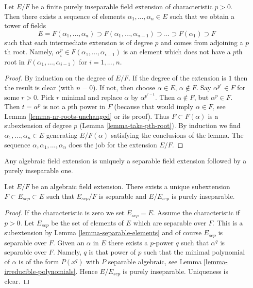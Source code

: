 \begin{lemma}
\label{lemma-finite-purely-inseparable}
Let $E/F$ be a finite purely inseparable field extension of
characteristic $p > 0$. Then there exists a sequence of elements
$\alpha_1, \ldots, \alpha_n \in E$ such that we obtain a tower
of fields
$$
E = F(\alpha_1, \ldots, \alpha_n) \supset
F(\alpha_1, \ldots, \alpha_{n - 1}) \supset
\ldots
\supset F(\alpha_1) \supset F
$$
such that each intermediate extension is of degree $p$ and comes
from adjoining a $p$th root. Namely,
$\alpha_i^p \in F(\alpha_1, \ldots, \alpha_{i - 1})$
is an element which does not have a $p$th root in
$F(\alpha_1, \ldots, \alpha_{i - 1})$ for $i = 1, \ldots, n$.
\end{lemma}

\begin{proof}
By induction on the degree of $E/F$. If the degree of the extension is $1$
then the result is clear (with $n = 0$). If not, then choose
$\alpha \in E$, $\alpha \not \in F$. Say $\alpha^{p^r} \in F$ for some
$r > 0$. Pick $r$ minimal and replace $\alpha$ by $\alpha^{p^{r - 1}}$.
Then $\alpha \not \in F$, but $\alpha^p \in F$. Then $t = \alpha^p$ is not
a $p$th power in $F$ (because that would imply $\alpha \in F$, see
Lemma \ref{lemma-nr-roots-unchanged} or its proof).
Thus $F \subset F(\alpha)$ is a subextension of degree $p$
(Lemma \ref{lemma-take-pth-root}). By induction we find
$\alpha_1, \ldots, \alpha_n \in E$ generating $E/F(\alpha)$
satisfying the conclusions of the lemma.
The sequence $\alpha, \alpha_1, \ldots, \alpha_n$ does the job
for the extension $E/F$.
\end{proof}

\begin{lemma}
\label{lemma-separable-first}
\begin{slogan}
Any algebraic field extension is uniquely a separable field extension
followed by a purely inseparable one.
\end{slogan}
Let $E/F$ be an algebraic field extension. There exists a unique subextension
$F \subset E_{sep} \subset E$ such that $E_{sep}/F$ is separable and
$E/E_{sep}$ is purely inseparable.
\end{lemma}

\begin{proof}
If the characteristic is zero we set $E_{sep} = E$. Assume the characteristic
if $p > 0$. Let $E_{sep}$ be the set of elements of $E$ which are separable
over $F$. This is a subextension by Lemma \ref{lemma-separable-elements}
and of course $E_{sep}$ is separable over $F$. Given an $\alpha$ in $E$
there exists a $p$-power $q$ such that $\alpha^q$ is separable over $F$.
Namely, $q$ is that power of $p$ such that the minimal polynomial of
$\alpha$ is of the form $P(x^q)$ with $P$ separable algebraic, see
Lemma \ref{lemma-irreducible-polynomials}. Hence $E/E_{sep}$ is purely
inseparable. Uniqueness is clear.
\end{proof}

